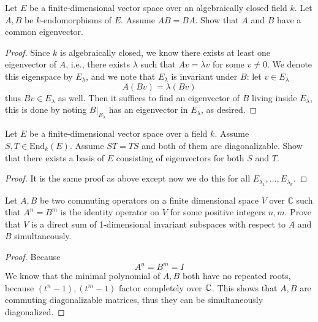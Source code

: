 \begin{prob}[S2009-Q4]
    Let \(E\) be a finite-dimensional vector space over an algebraically closed field \(k\). Let \(A, B\) be \(k\)-endomorphisms of \(E\). Assume \(AB = BA\). Show that \(A\) and \(B\) have a common eigenvector.
\end{prob}
\begin{proof}
    Since $k$ is algebraically closed, we know there exists at least one eigenvector of $A$, i.e., there exists $\lambda$ such that $Av=\lambda v$ for some $v\neq 0$. We denote this eigenspace by $E_\lambda$, and we note that $E_\lambda$ is invariant under $B$: let $v\in E_\lambda$
    \begin{equation*}
        A(Bv)=\lambda(Bv)
    \end{equation*}
    thus $Bv\in E_\lambda$ as well. Then it suffices to find an eigenvector of $B$ living inside $E_\lambda$, this is done by noting $B\vert_{E_\lambda}$ has an eigenvector in $E_\lambda$, as desired.
\end{proof}


\begin{prob}[F2005-Q6]
    Let \(E\) be a finite-dimensional vector space over a field \(k\). Assume \(S, T \in \text{End}_k(E)\). Assume \(ST = TS\) and both of them are diagonalizable. Show that there exists a basis of \(E\) consisting of eigenvectors for both \(S\) and \(T\).
\end{prob}
\begin{proof}
    It is the same proof as above except now we do this for all $E_{\lambda_1},\dots, E_{\lambda_k}$.
\end{proof}

\begin{prob}[S2015-Q2]
    Let \(A,B\) be two commuting operators on a finite dimensional space \(V\) over \(\mathbb{C}\) such that \(A^{n}=B^{m}\) is the identity operator on \(V\) for some positive integers \(n,m\). Prove that \(V\) is a direct sum of 1-dimensional invariant subspaces with respect to \(A\) and \(B\) simultaneously.
\end{prob}
\begin{proof}
    Because 
    \begin{equation*}
        A^n=B^m=I
    \end{equation*}
    We know that the minimal polynomial of $A,B$ both have no repeated roots, because $(t^n-1), (t^m-1)$ factor completely over $\mathbb{C}$. This shows that $A,B$ are commuting diagonalizable matrices, thus they can be simultaneously diagonalized.
\end{proof}






